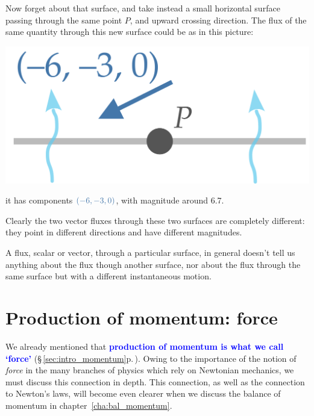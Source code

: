\documentclass[a4paper,12pt,%
onecolumn,oneside,%
british%
]{memoir}
\providecommand{\href}[2]{#2}
\renewcommand*{\|}[1][]{\nonscript\:#1\vert\nonscript\:\mathopen{}}
\newcommand*{\sect}{\S}%
\newcommand*{\chap}{chapter}%
\newcommand*{\furl}[2]{\href{#1}{#2}\pagenote{\url{#1}}}
\renewcommand*{\autoref}[3][\sect\,\ref]{\textcolor{blue}{#3} {\color{blue}\scriptsize(\faIcon[regular]{eye}\;#1{#2}\;p.\,\pageref{#2})}}
\begin{document}
Now forget about that surface, and take instead a small horizontal surface passing through the same point $P$, and upward crossing direction. The flux of the same quantity through this new surface could be as in this picture:
\begin{center}
  \includegraphics[align=c,scale=0.08]{images/skewfluxPy.pdf}
\end{center}
it has components $\mathcolor{blue}{(-6,-3,0)}$, with magnitude around \num{6.7}.

Clearly the two vector fluxes through these two surfaces are completely different: they point in different directions and have different magnitudes.

\begin{warning}
  A flux, scalar or vector, through a particular surface, in general doesn't tell us anything about the flux though another surface, nor about the flux through the same surface but with a different instantaneous motion.
\end{warning}


\section{Production of momentum: force}
\label{sec:force_is_production}

We already mentioned that \autoref{sec:intro_momentum}{\textbf{production of momentum is what we call \enquote*{force}}}. Owing to the importance of the notion of \emph{force} in the many branches of physics which rely on Newtonian mechanics, we must discuss this connection in depth. This connection, as well as the connection to Newton's laws, will become even clearer when we discuss the balance of momentum in \chap~\ref{cha:bal_momentum}.
\end{document}
